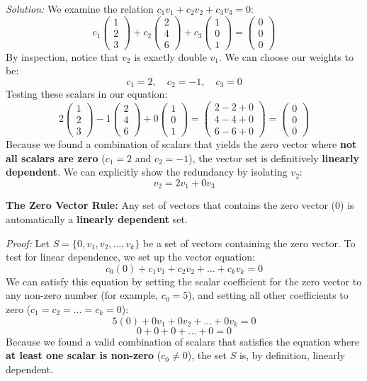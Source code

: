 \documentclass[11pt, a4paper]{article}
\begin{document}
	\noindent \textit{Solution:} We examine the relation $c_1 v_1 + c_2 v_2 + c_3 v_3 = 0$:
	\[
	c_1 \begin{pmatrix} 1 \\ 2 \\ 3 \end{pmatrix} + c_2 \begin{pmatrix} 2 \\ 4 \\ 6 \end{pmatrix} + c_3 \begin{pmatrix} 1 \\ 0 \\ 1 \end{pmatrix} = \begin{pmatrix} 0 \\ 0 \\ 0 \end{pmatrix}
	\]
	By inspection, notice that $v_2$ is exactly double $v_1$. We can choose our weights to be:
	\[
	c_1 = 2, \quad c_2 = -1, \quad c_3 = 0
	\]
	Testing these scalars in our equation:
	\[
	2 \begin{pmatrix} 1 \\ 2 \\ 3 \end{pmatrix} - 1 \begin{pmatrix} 2 \\ 4 \\ 6 \end{pmatrix} + 0 \begin{pmatrix} 1 \\ 0 \\ 1 \end{pmatrix} = \begin{pmatrix} 2 - 2 + 0 \\ 4 - 4 + 0 \\ 6 - 6 + 0 \end{pmatrix} = \begin{pmatrix} 0 \\ 0 \\ 0 \end{pmatrix}
	\]
	Because we found a combination of scalars that yields the zero vector where \textbf{not all scalars are zero} ($c_1 = 2$ and $c_2 = -1$), the vector set is definitively \textbf{linearly dependent}. We can explicitly show the redundancy by isolating $v_2$:
	\[
	v_2 = 2v_1 + 0v_3
	\]
	
	\noindent \textbf{The Zero Vector Rule:} Any set of vectors that contains the zero vector ($0$) is automatically a \textbf{linearly dependent} set.
	
	\noindent \textit{Proof:} Let $S = \{0, v_1, v_2, \dots, v_k\}$ be a set of vectors containing the zero vector. To test for linear dependence, we set up the vector equation:
	\[
	c_0(0) + c_1 v_1 + c_2 v_2 + \dots + c_k v_k = 0
	\]
	We can satisfy this equation by setting the scalar coefficient for the zero vector to any non-zero number (for example, $c_0 = 5$), and setting all other coefficients to zero ($c_1 = c_2 = \dots = c_k = 0$):
	\[
	5(0) + 0v_1 + 0v_2 + \dots + 0v_k = 0
	\]
	\[
	0 + 0 + 0 + \dots + 0 = 0
	\]
	Because we found a valid combination of scalars that satisfies the equation where \textbf{at least one scalar is non-zero} ($c_0 \neq 0$), the set $S$ is, by definition, linearly dependent.
	
\end{document}

